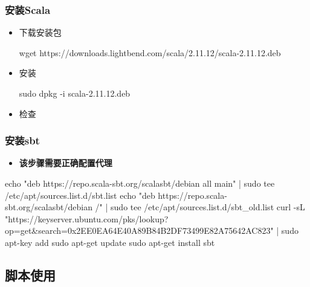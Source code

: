\subsubsection{安装Scala}\label{sec:04-advanced-cpu-012}

\begin{itemize}
\item
  下载安装包

\begin{CodeBlock}[language=BookShell]
wget https://downloads.lightbend.com/scala/2.11.12/scala-2.11.12.deb
\end{CodeBlock}
\item
  安装

\begin{CodeBlock}[language=BookShell]
sudo dpkg -i scala-2.11.12.deb
\end{CodeBlock}
\item
  检查

\end{itemize}

\subsubsection{安装sbt}\label{sec:04-advanced-cpu-013}

\begin{itemize}
\tightlist
\item
  \textbf{该步骤需要正确配置代理}
\end{itemize}

\begin{CodeBlock}[language=BookShell]
echo "deb https://repo.scala-sbt.org/scalasbt/debian all main" | sudo tee /etc/apt/sources.list.d/sbt.list
echo "deb https://repo.scala-sbt.org/scalasbt/debian /" | sudo tee /etc/apt/sources.list.d/sbt_old.list
curl -sL "https://keyserver.ubuntu.com/pks/lookup?op=get&search=0x2EE0EA64E40A89B84B2DF73499E82A75642AC823" | sudo apt-key add
sudo apt-get update
sudo apt-get install sbt
\end{CodeBlock}

\subsection{脚本使用}\label{sec:04-advanced-cpu-014}

